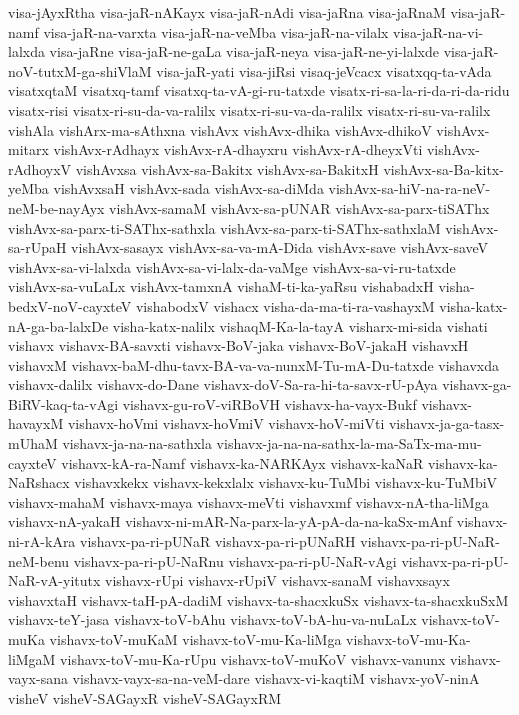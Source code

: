 {visa-jAyxRtha
visa-jaR-nAKayx
visa-jaR-nAdi
visa-jaRna
visa-jaRnaM
visa-jaR-namf
visa-jaR-na-varxta
visa-jaR-na-veMba
visa-jaR-na-vilalx
visa-jaR-na-vi-lalxda
visa-jaRne
visa-jaR-ne-gaLa
visa-jaR-neya
visa-jaR-ne-yi-lalxde
visa-jaR-noV-tutxM-ga-shiVlaM
visa-jaR-yati
visa-jiRsi
visaq-jeVcacx
visatxqq-ta-vAda
visatxqtaM
visatxq-tamf
visatxq-ta-vA-gi-ru-tatxde
visatx-ri-sa-la-ri-da-ri-da-ridu
visatx-risi
visatx-ri-su-da-va-ralilx
visatx-ri-su-va-da-ralilx
visatx-ri-su-va-ralilx
vishAla
vishArx-ma-sAthxna
vishAvx
vishAvx-dhika
vishAvx-dhikoV
vishAvx-mitarx
vishAvx-rAdhayx
vishAvx-rA-dhayxru
vishAvx-rA-dheyxVti
vishAvx-rAdhoyxV
vishAvxsa
vishAvx-sa-Bakitx
vishAvx-sa-BakitxH
vishAvx-sa-Ba-kitx-yeMba
vishAvxsaH
vishAvx-sada
vishAvx-sa-diMda
vishAvx-sa-hiV-na-ra-neV-neM-be-nayAyx
vishAvx-samaM
vishAvx-sa-pUNAR
vishAvx-sa-parx-tiSAThx
vishAvx-sa-parx-ti-SAThx-sathxla
vishAvx-sa-parx-ti-SAThx-sathxlaM
vishAvx-sa-rUpaH
vishAvx-sasayx
vishAvx-sa-va-mA-Dida
vishAvx-save
vishAvx-saveV
vishAvx-sa-vi-lalxda
vishAvx-sa-vi-lalx-da-vaMge
vishAvx-sa-vi-ru-tatxde
vishAvx-sa-vuLaLx
vishAvx-tamxnA
vishaM-ti-ka-yaRsu
vishabadxH
visha-bedxV-noV-cayxteV
vishabodxV
vishacx
visha-da-ma-ti-ra-vashayxM
visha-katx-nA-ga-ba-lalxDe
visha-katx-nalilx
vishaqM-Ka-la-tayA
visharx-mi-sida
vishati
vishavx
vishavx-BA-savxti
vishavx-BoV-jaka
vishavx-BoV-jakaH
vishavxH
vishavxM
vishavx-baM-dhu-tavx-BA-va-va-nunxM-Tu-mA-Du-tatxde
vishavxda
vishavx-dalilx
vishavx-do-Dane
vishavx-doV-Sa-ra-hi-ta-savx-rU-pAya
vishavx-ga-BiRV-kaq-ta-vAgi
vishavx-gu-roV-viRBoVH
vishavx-ha-vayx-Bukf
vishavx-havayxM
vishavx-hoVmi
vishavx-hoVmiV
vishavx-hoV-miVti
vishavx-ja-ga-tasx-mUhaM
vishavx-ja-na-na-sathxla
vishavx-ja-na-na-sathx-la-ma-SaTx-ma-mu-cayxteV
vishavx-kA-ra-Namf
vishavx-ka-NARKAyx
vishavx-kaNaR
vishavx-ka-NaRshacx
vishavxkekx
vishavx-kekxlalx
vishavx-ku-TuMbi
vishavx-ku-TuMbiV
vishavx-mahaM
vishavx-maya
vishavx-meVti
vishavxmf
vishavx-nA-tha-liMga
vishavx-nA-yakaH
vishavx-ni-mAR-Na-parx-la-yA-pA-da-na-kaSx-mAnf
vishavx-ni-rA-kAra
vishavx-pa-ri-pUNaR
vishavx-pa-ri-pUNaRH
vishavx-pa-ri-pU-NaR-neM-benu
vishavx-pa-ri-pU-NaRnu
vishavx-pa-ri-pU-NaR-vAgi
vishavx-pa-ri-pU-NaR-vA-yitutx
vishavx-rUpi
vishavx-rUpiV
vishavx-sanaM
vishavxsayx
vishavxtaH
vishavx-taH-pA-dadiM
vishavx-ta-shacxkuSx
vishavx-ta-shacxkuSxM
vishavx-teY-jasa
vishavx-toV-bAhu
vishavx-toV-bA-hu-va-nuLaLx
vishavx-toV-muKa
vishavx-toV-muKaM
vishavx-toV-mu-Ka-liMga
vishavx-toV-mu-Ka-liMgaM
vishavx-toV-mu-Ka-rUpu
vishavx-toV-muKoV
vishavx-vanunx
vishavx-vayx-sana
vishavx-vayx-sa-na-veM-dare
vishavx-vi-kaqtiM
vishavx-yoV-ninA
visheV
visheV-SAGayxR
visheV-SAGayxRM
}
